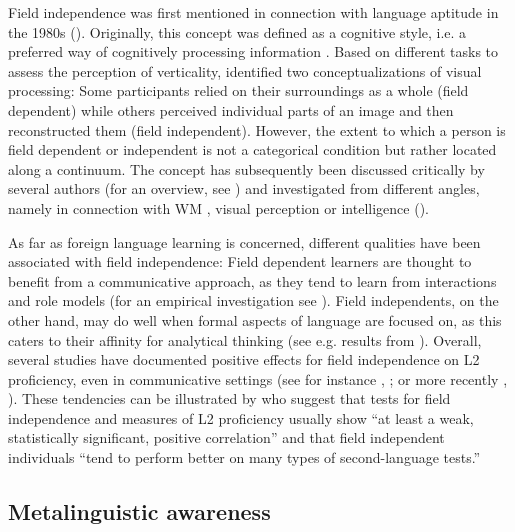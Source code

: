 \documentclass[output=paper]{langscibook}
\begin{document}
Field independence was first mentioned in connection with language aptitude in the 1980s (\citealt{ChapelleGreen1992}). Originally, this concept was defined as a cognitive style, i.e. a preferred way of cognitively processing information \citep{WitkinEtAl2014}. Based on different tasks to assess the perception of verticality, \citet{Witkin1949} identified two conceptualizations of visual processing: Some participants relied on their surroundings as a whole (field dependent) while others perceived individual parts of an image and then reconstructed them (field independent). However, the extent to which a person is field dependent or independent is not a categorical condition but rather located along a continuum. The concept has subsequently been discussed critically by several authors (for an overview, see \citealt{EvansEtAl2013}) and investigated from different angles, namely in connection with WM \citep{MiyakeEtAl2001}, visual perception \citep{Zhang2004} or intelligence (\citealt{RichardsonTurner2000}).

As far as foreign language learning is concerned, different qualities have been associated with field independence: Field dependent learners are thought to benefit from a communicative approach, as they tend to learn from interactions and role models (for an empirical investigation see \citealt{JohnsonEtAl2000}). Field independents, on the other hand, may do well when formal aspects of language are focused on, as this caters to their affinity for analytical thinking (see e.g. results from \citealt{StansfieldHansen1983}). Overall, several studies have documented positive effects for field independence on L2 proficiency, even in communicative settings (see for instance \citealt{ChapelleRoberts1986}, \citealt{Carter1988}; or more recently \citealt{FarsiEtAl2014}, \citealt{YaghoubiEtAl2014}). These tendencies can be illustrated by \citet[59]{ChapelleGreen1992} who suggest that tests for field independence and measures of L2 proficiency usually show “at least a weak, statistically significant, positive correlation” and that field independent individuals “tend to perform better on many types of second-language tests.”

\subsection{Metalinguistic awareness} %
\end{document}

